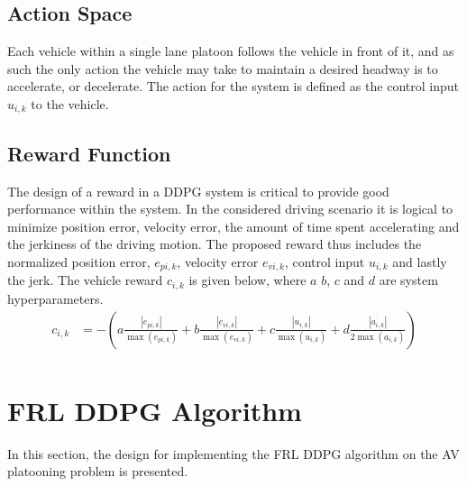 \subsection{Action Space}
Each vehicle within a single lane platoon follows the vehicle in front of it, and as 
such the only action the vehicle may take to maintain a desired headway is to accelerate, 
or decelerate. The action for the system is defined as the control input $u_{i,k}$ to the 
vehicle.

\subsection{Reward Function}
The design of a reward in a DDPG system is critical to provide good performance within 
the system.  In the considered driving scenario it is logical to minimize position error, 
velocity error, the amount of time spent accelerating and the jerkiness of the driving 
motion.  The proposed reward thus includes the normalized position error, $e_{pi,k}$, 
velocity error $e_{vi,k}$, control input $u_{i,k}$ and lastly the jerk. The vehicle 
reward $c_{i,k}$ is given below, where $a$ $b$, $c$ and $d$ are system hyperparameters.
\begin{equation} \label{eqn:rewardB}
\begin{aligned}
    c_{i,k} &= -\left(a\frac{|e_{pi,k}|}{\max(e_{pi,k})} + b\frac{|e_{vi,k}|}{\max(e_{vi,k})} + c\frac{|u_{i,k}|}{\max(u_{i,k})} +  d\frac{\dot{|a_{i,k}|}}{2\max(a_{i,k})}\right) \\
\end{aligned}
\end{equation}

\section{FRL DDPG Algorithm}
In this section, the design for implementing the FRL DDPG algorithm on the AV platooning 
problem is presented. 
